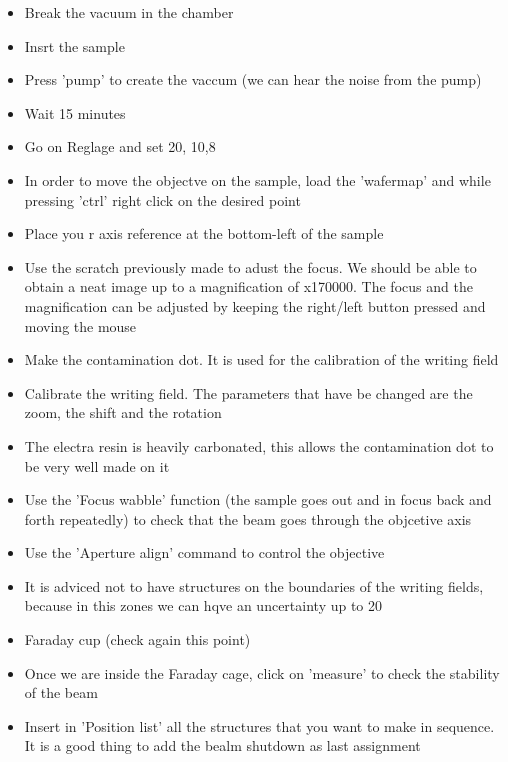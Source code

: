 \documentclass[a4paper]{article}
\begin{document}
\begin{itemize}
  \item Break the vacuum in the chamber
  \item Insrt the sample
  \item Press 'pump' to create the vaccum (we can hear the noise from the pump)
  \item Wait 15 minutes
  \item Go on Reglage and set \unit{20}{\kilo\volt}, \unit{10}{\micro\metre},\unit{8}{\milli\metre}
  \item In order to move the objectve on the sample, load the 'wafermap' and while pressing 'ctrl' right click on the desired point
  \item Place you r axis reference at the bottom-left of the sample
  \item Use the scratch previously made to adust the focus. We should be able to obtain a neat image up to a magnification of x170000. The focus and the magnification can be adjusted by keeping the right/left button pressed and moving the mouse
  \item Make the contamination dot. It is used for the calibration of the writing field
  \item Calibrate the writing field. The parameters that have be changed are the zoom, the shift and the rotation
  \item The electra resin is heavily carbonated, this allows the contamination dot to be very well made on it
  \item Use the 'Focus wabble' function (the sample goes out and in focus back and forth repeatedly) to check that the beam goes through the objcetive axis
  \item Use the 'Aperture align' command to control the objective
  \item It is adviced not to have structures on the boundaries of the writing fields, because in this zones we can hqve an uncertainty up to \unit{20}{\nano\metre}
  \item Faraday cup (check again this point)
  \item Once we are inside the Faraday cage, click on 'measure' to check the stability of the beam
  \item Insert in 'Position list' all the structures that you want to make in sequence. It is a good thing to add the bealm shutdown as last assignment
\end{itemize}

 
\end{document}

